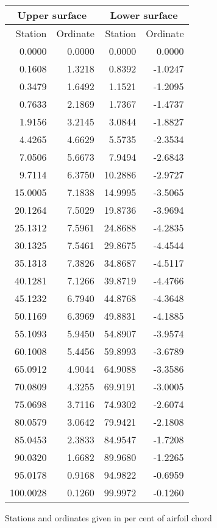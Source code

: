 \documentclass[11pt]{book}
\begin{document}
 \hspace{4mm}
 \begin{tabular}{|r|r|r|r|} \hline 
 \multicolumn{2}{|c|}{Upper surface} & \multicolumn{2}{|c|}{Lower surface} \\
 \hline
 Station & Ordinate & Station & Ordinate \\
 \hline
0.0000 & 0.0000 & 0.0000 & 0.0000 \\
0.1608 & 1.3218 & 0.8392 & -1.0247 \\
0.3479 & 1.6492 & 1.1521 & -1.2095 \\
0.7633 & 2.1869 & 1.7367 & -1.4737 \\
1.9156 & 3.2145 & 3.0844 & -1.8827 \\
4.4265 & 4.6629 & 5.5735 & -2.3534 \\
7.0506 & 5.6673 & 7.9494 & -2.6843 \\
9.7114 & 6.3750 & 10.2886 & -2.9727 \\
15.0005 & 7.1838 & 14.9995 & -3.5065 \\
20.1264 & 7.5029 & 19.8736 & -3.9694 \\
25.1312 & 7.5961 & 24.8688 & -4.2835 \\
30.1325 & 7.5461 & 29.8675 & -4.4544 \\
35.1313 & 7.3826 & 34.8687 & -4.5117 \\
40.1281 & 7.1266 & 39.8719 & -4.4766 \\
45.1232 & 6.7940 & 44.8768 & -4.3648 \\
50.1169 & 6.3969 & 49.8831 & -4.1885 \\
55.1093 & 5.9450 & 54.8907 & -3.9574 \\
60.1008 & 5.4456 & 59.8993 & -3.6789 \\
65.0912 & 4.9044 & 64.9088 & -3.3586 \\
70.0809 & 4.3255 & 69.9191 & -3.0005 \\
75.0698 & 3.7116 & 74.9302 & -2.6074 \\
80.0579 & 3.0642 & 79.9421 & -2.1808 \\
85.0453 & 2.3833 & 84.9547 & -1.7208 \\
90.0320 & 1.6682 & 89.9680 & -1.2265 \\
95.0178 & 0.9168 & 94.9822 & -0.6959 \\
100.0028 & 0.1260 & 99.9972 & -0.1260 \\
 \hline 
 \end{tabular}
 \vspace{8mm}

Stations and ordinates given in per cent of airfoil chord
\end{document}
